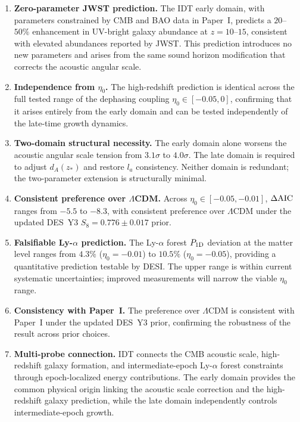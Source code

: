 \documentclass[aps,prd,twocolumn,superscriptaddress,nofootinbib]{revtex4-2}
\newcommand{\dAIC}{\Delta{\rm AIC}}
\begin{document}
\begin{enumerate}
\item \textbf{Zero-parameter JWST prediction.} The IDT early domain,
with parameters constrained by CMB and BAO data in Paper~I, predicts
a $20$--$50\%$ enhancement in UV-bright galaxy abundance at
$z = 10$--$15$, consistent with elevated abundances reported by
JWST. This prediction introduces no new parameters and arises from
the same sound horizon modification that corrects the acoustic
angular scale.

\item \textbf{Independence from $\eta_0$.} The high-redshift
prediction is identical across the full tested range of the
dephasing coupling $\eta_0 \in [-0.05, 0]$, confirming that it
arises entirely from the early domain and can be tested
independently of the late-time growth dynamics.

\item \textbf{Two-domain structural necessity.} The early domain
alone worsens the acoustic angular scale tension from $3.1\sigma$
to $4.0\sigma$. The late domain is required to adjust $d_A(z_*)$
and restore $l_a$ consistency. Neither domain is redundant; the
two-parameter extension is structurally minimal.

\item \textbf{Consistent preference over $\Lambda$CDM.} Across
$\eta_0 \in [-0.05, -0.01]$, $\dAIC$ ranges from $-5.5$ to $-8.3$,
with consistent preference over $\Lambda$CDM under the updated
DES~Y3 $S_8 = 0.776 \pm 0.017$ prior.

\item \textbf{Falsifiable Ly-$\alpha$ prediction.} The Ly-$\alpha$
forest $P_{1{\rm D}}$ deviation at the matter level ranges from
$4.3\%$ ($\eta_0 = -0.01$) to $10.5\%$ ($\eta_0 = -0.05$),
providing a quantitative prediction testable by DESI. The upper
range is within current systematic uncertainties; improved
measurements will narrow the viable $\eta_0$ range.

\item \textbf{Consistency with Paper~I.} The preference over
$\Lambda$CDM is consistent with Paper~I under the updated DES~Y3
prior, confirming the robustness of the result across prior
choices.

\item \textbf{Multi-probe connection.} IDT connects the CMB
acoustic scale, high-redshift galaxy formation, and
intermediate-epoch Ly-$\alpha$ forest constraints through
epoch-localized energy contributions. The early domain provides the
common physical origin linking the acoustic scale correction and
the high-redshift galaxy prediction, while the late domain
independently controls intermediate-epoch growth.
\end{enumerate}
\end{document}
